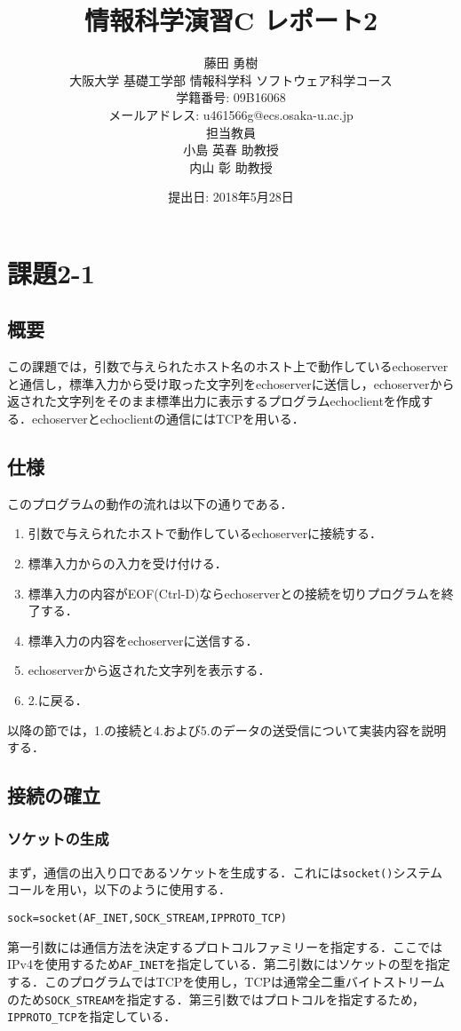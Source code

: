 \documentclass[a4j,10pt,titlepage]{jsarticle}
\title{情報科学演習C レポート2}
\author{藤田 勇樹 \\
大阪大学 基礎工学部 情報科学科 ソフトウェア科学コース\\
学籍番号: 09B16068 \\
メールアドレス: u461566g@ecs.osaka-u.ac.jp \\
担当教員\\
小島 英春 助教授 \\
内山 彰 助教授}
\date{提出日: 2018年5月28日}
\begin{document}
\maketitle
\section{課題2-1}
\subsection{概要}
この課題では，引数で与えられたホスト名のホスト上で動作しているechoserverと通信し，標準入力から受け取った文字列をechoserverに送信し，echoserverから返された文字列をそのまま標準出力に表示するプログラムechoclientを作成する．echoserverとechoclientの通信にはTCPを用いる．

\subsection{仕様}
このプログラムの動作の流れは以下の通りである．
\begin{enumerate}
	\item 引数で与えられたホストで動作しているechoserverに接続する．
	\item 標準入力からの入力を受け付ける．
	\item 標準入力の内容がEOF(Ctrl-D)ならechoserverとの接続を切りプログラムを終了する．
	\item 標準入力の内容をechoserverに送信する．
	\item echoserverから返された文字列を表示する．
	\item 2.に戻る．
\end{enumerate}

以降の節では，1.の接続と4.および5.のデータの送受信について実装内容を説明する．

\subsection{接続の確立}
\subsubsection{ソケットの生成}
まず，通信の出入り口であるソケットを生成する．これには\verb|socket()|システムコールを用い，以下のように使用する．
\begin{verbatim}
sock=socket(AF_INET,SOCK_STREAM,IPPROTO_TCP)
\end{verbatim}
第一引数には通信方法を決定するプロトコルファミリーを指定する．ここではIPv4を使用するため\verb|AF_INET|を指定している．第二引数にはソケットの型を指定する．このプログラムではTCPを使用し，TCPは通常全二重バイトストリームのため\verb|SOCK_STREAM|を指定する．第三引数ではプロトコルを指定するため，\verb|IPPROTO_TCP|を指定している．
\end{document}
